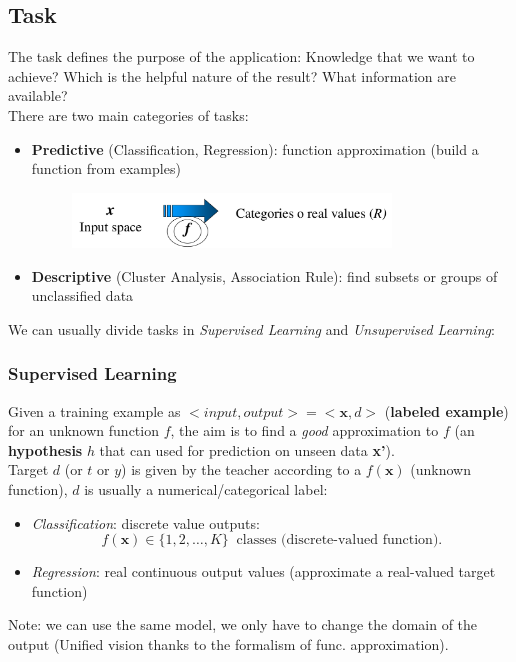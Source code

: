 \documentclass[../main.tex]{subfiles}
\begin{document}
\subsection{Task}
The task defines the purpose of the application: Knowledge that we want to achieve? Which is the helpful nature of the result? What information are available?\\
There are two main categories of tasks:
\begin{itemize}
    \item \textbf{Predictive} (Classification, Regression): function approximation (build a function from examples)
	\begin{figure}[H]
	    \centering
	    \includegraphics[width=0.8\textwidth]{lectures/1_Introduction/task_pred.png}
	    \label{fig:task-scheme}
	\end{figure}
    \item \textbf{Descriptive} (Cluster Analysis, Association Rule): find subsets or groups of unclassified data
\end{itemize}
We can usually divide tasks in \textit{Supervised Learning} and \textit{Unsupervised Learning}:

\subsubsection*{Supervised Learning}%
Given a training example as $<input,output>=<\textbf{x},d>$ (\textbf{labeled example}) for an unknown function $f$, the aim is to find a \emph{good} approximation to $f$ (an \textbf{hypothesis} $h$ that can used for prediction on unseen data \textbf{x'}).\\
Target $d$ (or $t$ or $y$) is given by the teacher according to a $f(\mathbf{x})$ (unknown function), $d$ is usually a numerical/categorical label:
\begin{itemize}
    \item \textit{Classification}: discrete value outputs: 
	\[
    	f(\mathbf{x}) \in \{1, 2, \dots, K\} \; \; \text{classes (discrete-valued function)}
	.\] 
    \item \textit{Regression}: real continuous output values (approximate a real-valued
target function)
\end{itemize}
Note: we can use the same model, we only have to change the domain of the output (Unified vision thanks to the formalism of func. approximation).
\end{document}
